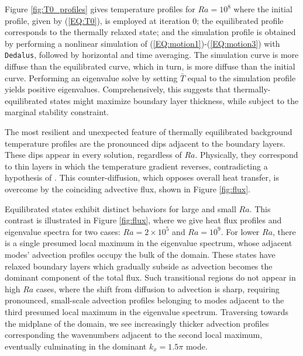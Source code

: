 \documentclass[reprint,amsmath,amssymb,aps]{revtex4-1}
\begin{document}
\par Figure \ref{fig:T0_profiles} gives temperature profiles for $Ra = 10^8$ where the initial profile, given by (\ref{EQ:T0}), is employed at iteration 0; the equilibrated profile corresponds to the thermally relaxed state; and the simulation profile is obtained by performing a nonlinear simulation of (\ref{EQ:motion1})-(\ref{EQ:motion3}) with \texttt{Dedalus}, followed by horizontal and time averaging. The simulation curve is more diffuse than the equilibrated curve, which in turn, is more diffuse than the initial curve. Performing an eigenvalue solve by setting $\bar{T}$ equal to the simulation profile yields positive eigenvalues. Comprehensively, this suggests that thermally-equilibrated states might maximize boundary layer thickness, while subject to the marginal stability constraint.
\par The most resilient and unexpected feature of thermally equilibrated background temperature profiles are the pronounced dips adjacent to the boundary layers. These dips appear in every solution, regardless of $Ra$. Physically, they correspond to thin layers in which the temperature gradient reverses, contradicting a hypothesis of \cite{Malkus}. This counter-diffusion, which opposes overall heat transfer, is overcome by the coinciding advective flux, shown in Figure \ref{fig:flux}. 

Equilibrated states exhibit distinct behaviors for large and small $Ra$. This contrast is illustrated in Figure \ref{fig:flux}, where we give heat flux profiles and eigenvalue spectra for two cases: $Ra = 2 \times 10^5$ and $Ra = 10^9$. For lower $Ra$, there is a single presumed local maximum in the eigenvalue spectrum, whose adjacent modes' advection profiles occupy the bulk of the domain. These states have relaxed boundary layers which gradually subside as advection becomes the dominant component of the total flux. Such transitional regions do not appear in high $Ra$ cases, where the shift from diffusion to advection is sharp, requiring pronounced, small-scale advection profiles belonging to modes adjacent to the third presumed local maximum in the eigenvalue spectrum. Traversing towards the midplane of the domain, we see increasingly thicker advection profiles corresponding the wavenumbers adjacent to the second local maximum, eventually culminating in the dominant $k_x = 1.5\pi$ mode.
\end{document}
